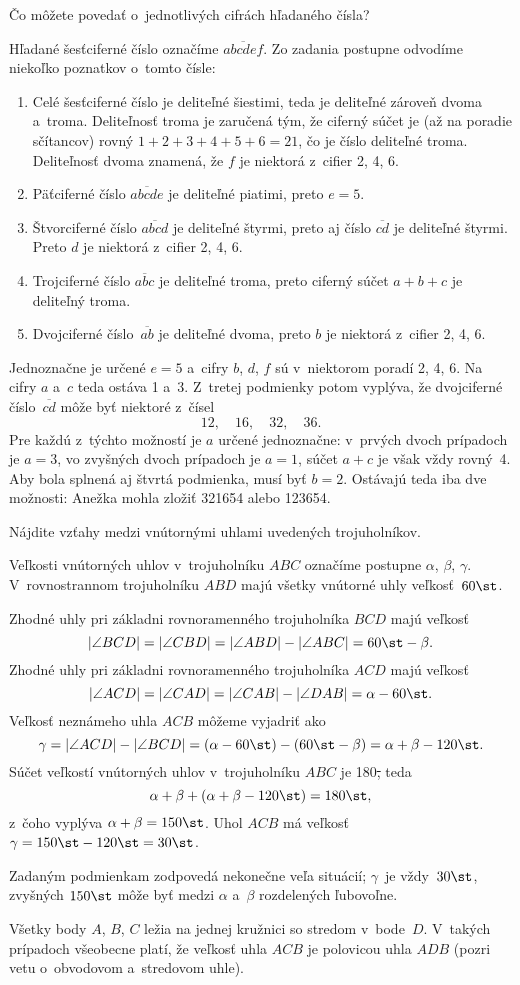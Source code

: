 {%
\napad
Čo môžete povedať o~jednotlivých cifrách hľadaného čísla?

\riesenie
Hľadané šesťciferné číslo označíme $\overline{abcdef}$.
Zo zadania postupne odvodíme niekoľko poznatkov o~tomto čísle:
\begin{enumerate}
\item Celé šesťciferné číslo je deliteľné šiestimi, teda je deliteľné zároveň dvoma a~troma.
Deliteľnosť troma je zaručená tým, že ciferný súčet je (až na poradie sčítancov) rovný $1+2+3+4+5+6=21$, čo je číslo deliteľné troma.
Deliteľnosť dvoma znamená, že $f$ je niektorá z~cifier 2, 4, 6.
\item Päťciferné číslo $\overline{abcde}$ je deliteľné piatimi, preto $e=5$.
\item Štvorciferné číslo $\overline{abcd}$ je deliteľné štyrmi, preto aj číslo $\overline{cd}$ je deliteľné štyrmi.
Preto $d$ je niektorá z~cifier 2, 4, 6.
\item Trojciferné číslo $\overline{abc}$ je deliteľné troma, preto ciferný súčet $a+b+c$ je deliteľný troma.
\item Dvojciferné číslo~$\overline{ab}$ je deliteľné dvoma, preto $b$ je niektorá z~cifier 2, 4, 6.
\end{enumerate}
Jednoznačne je určené $e=5$ a~cifry $b$, $d$, $f$ sú v~niektorom poradí 2, 4, 6.
Na cifry $a$ a~$c$ teda ostáva 1 a~3.
Z~tretej podmienky potom vyplýva, že dvojciferné číslo~$\overline{cd}$ môže byť niektoré z~čísel
$$
12,\quad 16,\quad 32,\quad 36.
$$
Pre každú z~týchto možností je $a$ určené jednoznačne:
v~prvých dvoch prípadoch je $a=3$, vo zvyšných dvoch prípadoch je $a=1$, súčet $a+c$ je však vždy rovný~4.
Aby bola splnená aj štvrtá podmienka, musí byť $b=2$.
Ostávajú teda iba dve možnosti:
Anežka mohla zložiť 321654 alebo 123654.
}

{%
\napad
Nájdite vzťahy medzi vnútornými uhlami uvedených trojuholníkov.

\riesenie
Veľkosti vnútorných uhlov v~trojuholníku $ABC$ označíme postupne $\alpha$, $\beta$, $\gamma$.
V~rovnostrannom trojuholníku $ABD$ majú všetky vnútorné uhly veľkosť~$60\st$.
%


Zhodné uhly pri základni rovnoramenného trojuholníka $BCD$ majú veľkosť
$$
|\angle BCD|=|\angle CBD|=|\angle ABD|-|\angle ABC|=60\st-\beta.
$$
Zhodné uhly pri základni rovnoramenného trojuholníka $ACD$ majú veľkosť
$$
|\angle ACD|=|\angle CAD|=|\angle CAB|-|\angle DAB|=\alpha-60\st.
$$
Veľkosť neznámeho uhla $ACB$ môžeme vyjadriť ako
$$
\gamma=|\angle ACD|-|\angle BCD|=
(\alpha-60\st)-(60\st-\beta)=\alpha+\beta-120\st.
$$
Súčet veľkostí vnútorných uhlov v~trojuholníku $ABC$ je 180\st, teda
$$
\alpha+\beta+(\alpha+\beta-120\st)=180\st,
$$
z~čoho vyplýva $\alpha+\beta=150\st$.
Uhol $ACB$ má veľkosť $\gamma=150\st-120\st=30\st$.

\poznamka
Zadaným podmienkam zodpovedá nekonečne veľa situácií;
$\gamma$~je vždy~$30\st$, zvyšných $150\st$ môže byť medzi $\alpha$ a~$\beta$ rozdelených ľubovoľne.

Všetky body $A$, $B$, $C$ ležia na jednej kružnici so stredom v~bode~$D$.
V~takých prípadoch všeobecne platí, že veľkosť uhla $ACB$ je polovicou uhla $ADB$ (pozri vetu o~obvodovom a~stredovom uhle).
}

